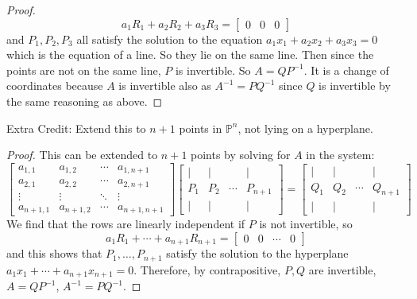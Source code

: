 \documentclass{article}
\begin{document}
\begin{proof}
            \begin{equation*}
                a_{1}R_{1} + a_{2}R_{2} + a_{3}R_{3} = \begin{bmatrix}
                    0 & 0 & 0   
                \end{bmatrix}
            \end{equation*}
        and $P_{1}, P_{2}, P_{3}$ all satisfy the solution to the equation $a_{1}x_{1} + a_{2}x_{2} + a_{3}x_{3} = 0$ which is the equation of a line. So they lie on the same line. Then since the points are not on the same line, $P$ is invertible. So $A = QP^{-1}$. It is a change of coordinates because $A$ is invertible also as $A^{-1} = PQ^{-1}$ since $Q$ is invertible by the same reasoning as above.
   \end{proof}

Extra Credit: Extend this to $n + 1$ points in $\mathbb{P}^{n}$, not lying on a hyperplane.
    \begin{proof}
        This can be extended to $n + 1$ points by solving for $A$ in the system:
            \begin{equation*}
                \begin{bmatrix}
                    a_{1, 1}      & a_{1, 2}     &  \cdots &  a_{1, n + 1}     \\
                    a_{2, 1}      & a_{2, 2}     &  \cdots &  a_{2, n + 1}     \\
                    \vdots        &  \vdots      &  \ddots &  \vdots           \\
                     a_{n + 1, 1} & a_{n + 1, 2} &  \cdots &  a_{n + 1, n + 1}   
                \end{bmatrix} \begin{bmatrix}
                    \mid   &  \mid &         &  \mid      \\
                     P_{1} & P_{2} &  \cdots &  P_{n + 1} \\
                    \mid   &  \mid &         &  \mid        
                \end{bmatrix} = \begin{bmatrix}
                    \mid   &  \mid &        &  \mid      \\
                     Q_{1} & Q_{2} & \cdots &  Q_{n + 1} \\
                    \mid   &  \mid &        &  \mid        
                \end{bmatrix}
            \end{equation*}
        We find that the rows are linearly independent if $P$ is not invertible, so
            \begin{equation*}
                a_{1}R_{1} + \cdots + a_{n + 1}R_{n + 1} = \begin{bmatrix}
                    0 & 0 & \cdots &  0   
                \end{bmatrix}
            \end{equation*}
        and this shows that $P_{1}, \ldots, P_{n + 1}$ satisfy the solution to the hyperplane $a_{1}x_{1} + \cdots + a_{n + 1}x_{n + 1} = 0$. Therefore, by contrapositive, $P, Q$ are invertible, $A = QP^{-1}$, $A^{-1} = PQ^{-1}$.
    \end{proof}
\end{document}
